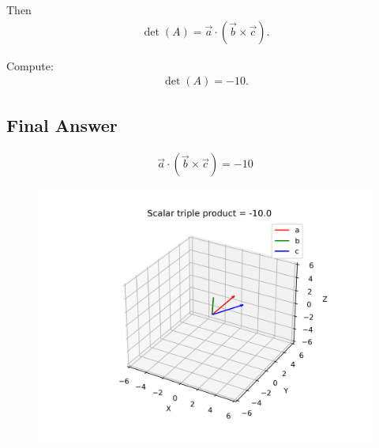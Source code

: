 \documentclass[12pt]{article}
\begin{document}
Then
\begin{align}
\det(A) = \vec{a} \cdot (\vec{b} \times \vec{c}).
\end{align}

Compute:
\begin{align}
\det(A) = -10.
\end{align}

\subsection*{Final Answer}
\begin{align}
\boxed{\ \vec{a} \cdot (\vec{b} \times \vec{c}) = -10\ }
\end{align}

\begin{figure}[H]
    \centering
    \includegraphics[width=0.9\columnwidth]{figs/gram_triple_product.png}
    \caption{}
    \label{fig:placeholder}
\end{figure}
\end{document}
